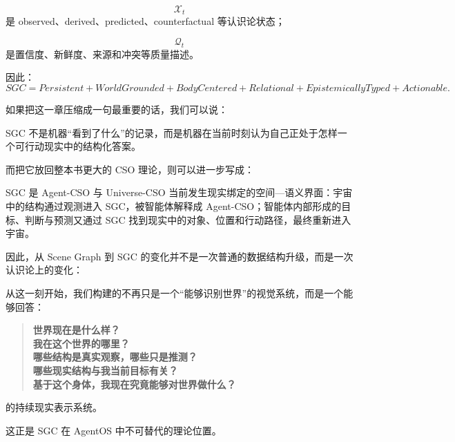 \[
\mathcal X_t
\]
是 observed、derived、predicted、counterfactual 等认识论状态；

\[
\mathcal Q_t
\]
是置信度、新鲜度、来源和冲突等质量描述。

因此：
\[
\boxed{
SGC
=
Persistent
+
WorldGrounded
+
BodyCentered
+
Relational
+
EpistemicallyTyped
+
Actionable.
}
\]

如果把这一章压缩成一句最重要的话，我们可以说：

\begin{statementbox}
SGC 不是机器“看到了什么”的记录，而是机器在当前时刻认为自己正处于怎样一个可行动现实中的结构化答案。
\end{statementbox}

而把它放回整本书更大的 CSO 理论，则可以进一步写成：

\begin{statementbox}
SGC 是 Agent-CSO 与 Universe-CSO 当前发生现实绑定的空间—语义界面：宇宙中的结构通过观测进入 SGC，被智能体解释成 Agent-CSO；智能体内部形成的目标、判断与预测又通过 SGC 找到现实中的对象、位置和行动路径，最终重新进入宇宙。
\end{statementbox}

因此，从 Scene Graph 到 SGC 的变化并不是一次普通的数据结构升级，而是一次认识论上的变化：

\begin{statementbox}
\centering
{}
\end{statementbox}

从这一刻开始，我们构建的不再只是一个“能够识别世界”的视觉系统，而是一个能够回答：

\begin{quote}
\textbf{世界现在是什么样？}\\
\textbf{我在这个世界的哪里？}\\
\textbf{哪些结构是真实观察，哪些只是推测？}\\
\textbf{哪些现实结构与我当前目标有关？}\\
\textbf{基于这个身体，我现在究竟能够对世界做什么？}
\end{quote}

的持续现实表示系统。

这正是 SGC 在 AgentOS 中不可替代的理论位置。
